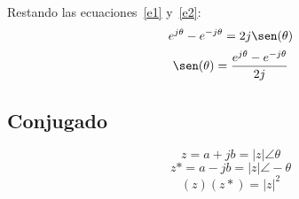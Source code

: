 Restando las ecuaciones~\ref{e1} y~\ref{e2}:
\begin{equation*}
    e^{j\theta}-e^{-j\theta}=2j\sen(\theta)
\end{equation*}
\begin{equation}
    \sen(\theta)=\frac{e^{j\theta}-e^{-j\theta}}{2j}
\end{equation}

\subsection{Conjugado}
\begin{figure}[H]
    \centering
    
\end{figure}
\begin{equation*}
    z=a+jb=|z|\angle\theta
\end{equation*}
\begin{equation*}
    z*=a-jb=|z|\angle-\theta
\end{equation*}
\begin{equation*}
    (z)(z*)={|z|}^2
\end{equation*}

